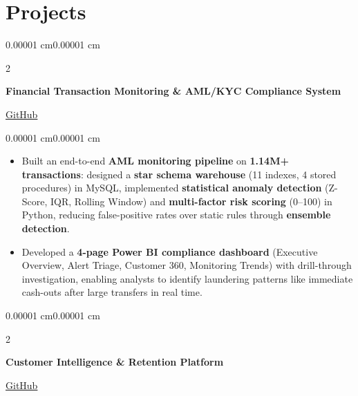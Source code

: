 \documentclass[10pt, letterpaper]{article}
\newenvironment{highlights}{
    \begin{itemize}[
        topsep=0.10 cm,
        parsep=0.10 cm,
        partopsep=0pt,
        itemsep=0pt,
        leftmargin=10pt
    ]
}{
    \end{itemize}
}
\newenvironment{onecolentry}{
    \begin{adjustwidth}{0.00001 cm}{0.00001 cm}
}{
    \end{adjustwidth}
}
\newenvironment{twocolentry}[2][]{
    \onecolentry
    \def\secondColumn{#2}
    \setcolumnwidth{\fill, 4.5 cm}
    \begin{paracol}{2}
}{
    \switchcolumn \raggedleft \secondColumn
    \end{paracol}
    \endonecolentry
}
\begin{document}
\section{\textcolor{myblue}{\textbf{Projects}}}

\begin{twocolentry}{\href{https://github.com/Verma-Rohil/Banking_AML_PowerBI_Dashboard}{\textcolor{myblue}{\faIcon{github} GitHub}}}
\textbf{Financial Transaction Monitoring \& AML/KYC Compliance System}
\end{twocolentry}

\vspace{0.06cm}

\begin{onecolentry}
\begin{highlights}
\item Built an end-to-end \textbf{AML monitoring pipeline} on \textbf{1.14M+ transactions}: designed a \textbf{star schema warehouse} (11 indexes, 4 stored procedures) in MySQL, implemented \textbf{statistical anomaly detection} (Z-Score, IQR, Rolling Window) and \textbf{multi-factor risk scoring} (0--100) in Python, reducing false-positive rates over static rules through \textbf{ensemble detection}.
\item Developed a \textbf{4-page Power BI compliance dashboard} (Executive Overview, Alert Triage, Customer 360, Monitoring Trends) with drill-through investigation, enabling analysts to identify laundering patterns like immediate cash-outs after large transfers in real time.
\end{highlights}
\end{onecolentry}

\vspace{0.15cm}

\begin{twocolentry}{\href{https://github.com/Verma-Rohil/customer-intelligence-platform}{\textcolor{myblue}{ GitHub}}}
\textbf{Customer Intelligence \& Retention Platform}
\end{twocolentry}

\vspace{0.06cm}
\end{document}
